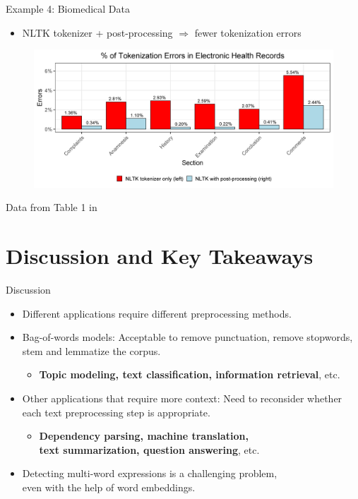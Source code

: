 \documentclass{beamer}
\renewcommand{\cite}{\citep}
\begin{document}
\begin{frame}{Example 4: Biomedical Data}
\begin{itemize}
\item NLTK tokenizer + post-processing $\Rightarrow$ fewer tokenization errors
\end{itemize}
\begin{figure}[!ht]
	\centering
	\includegraphics[width=\textwidth]{Figures/gron2018_table1.png}
\end{figure}
\begin{flushright}
Data from Table 1 in~\cite{gron2018clinical}
\end{flushright}
\end{frame}


\section{Discussion and Key Takeaways}


\begin{frame}{Discussion}
\begin{itemize}
\item Different applications require different preprocessing methods.
	\bigskip
\item Bag-of-words models: Acceptable to remove punctuation, remove stopwords, stem and lemmatize the corpus.
	\begin{itemize}
	\item \textbf{Topic modeling, text classification, information retrieval}, etc.
	\end{itemize}
	\bigskip
\item Other applications that require more context: Need to reconsider whether each text preprocessing step is appropriate.
	\begin{itemize}
	\item \textbf{Dependency parsing, machine translation,\\
		text summarization, question answering}, etc.
	\end{itemize}
	\bigskip
\item Detecting multi-word expressions is a challenging problem,\\
	even with the help of word embeddings.~\cite{park2019learning}
\end{itemize}
\end{frame}
\end{document}
